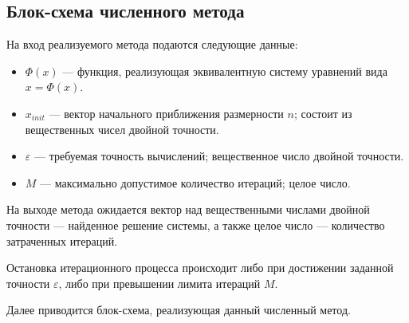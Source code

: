 \subsection{Блок-схема численного метода}

На вход реализуемого метода подаются следующие данные:

\begin{itemize}
  \item \(\Phi(x)\) --- функция, реализующая эквивалентную систему уравнений вида \(x = \Phi(x)\).
  \item \(x_{init}\) --- вектор начального приближения размерности \(n\); состоит из вещественных чисел двойной точности.
  \item \(\varepsilon\) --- требуемая точность вычислений; вещественное число двойной точности.
  \item \(M\) --- максимально допустимое количество итераций; целое число.
\end{itemize}

На выходе метода ожидается вектор над вещественными числами двойной точности --- найденное решение системы, а также целое число --- количество затраченных итераций. 

Остановка итерационного процесса происходит либо при достижении заданной точности \(\varepsilon\), либо при превышении лимита итераций \(M\).

Далее приводится блок-схема, реализующая данный численный метод.

